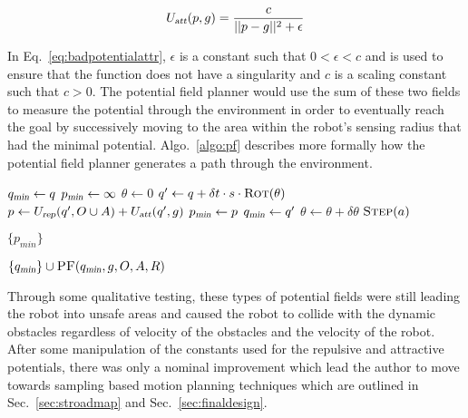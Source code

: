 \begin{equation}
    U_{\Var{att}}(p, g) = \frac{c}{||p - g||^2 + \epsilon}
    \label{eq:badpotentialattr}
\end{equation}

In Eq.~\ref{eq:badpotentialattr}, $\epsilon$ is a constant such that $0 <
\epsilon < c$ and is used to ensure that the function does not have a
singularity and $c$ is a scaling constant such that $c > 0$. The potential
field planner would use the sum of these two fields to measure the potential
through the environment in order to eventually reach the goal by successively
moving to the area within the robot's sensing radius that had the minimal
potential. Algo.~\ref{algo:pf} describes more formally how the potential field
planner generates a path through the environment.

\begin{algorithm}[ht]

    \caption{$\Function{PF}(q, g, O, A, R)$}

    \label{algo:pf}
    \begin{algorithmic}[1]
        \setcounter{ALC@line}{0}
        \vspace*{1mm}

        \STATE $q_{\Var{min}} \leftarrow q$
        \STATE $p_{\Var{min}} \leftarrow \infty$
        \STATE $\theta \leftarrow 0$
        \WHILE {$\theta \leq 2\pi$}
            \STATE $q' \leftarrow q + \delta t \cdot s \cdot
            \Function{Rot}(\theta)$
            \STATE $p \leftarrow U_{\Var{rep}}(q', O \cup A)
            + U_{\Var{att}}(q', g)$
               \STATE $p_{\Var{min}} \leftarrow p$
                \STATE $q_{\Var{min}} \leftarrow q'$
            \ENDIF
            \STATE $\theta \leftarrow \theta + \delta \theta$
                \STATE $\Function{Step}(a)$
            \ENDFOR
        \ENDWHILE

            \RETURN $\{p_{min}\}$
        \ENDIF

        \RETURN $\{q_{\Var{min}}\} \cup \Function{PF}(q_{\Var{min}}, g, O, A, R)$
    \end{algorithmic}
\end{algorithm}

Through some qualitative testing, these types of potential fields were still
leading the robot into unsafe areas and caused the robot to collide with the
dynamic obstacles regardless of velocity of the obstacles and the velocity of
the robot. After some manipulation of the constants used for the repulsive and
attractive potentials, there was only a nominal improvement which lead the
author to move towards sampling based motion planning techniques which are
outlined in Sec.~\ref{sec:stroadmap} and Sec.~\ref{sec:finaldesign}.

